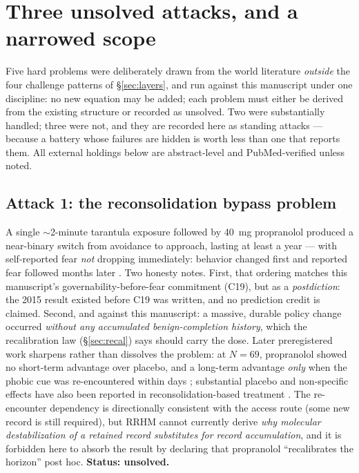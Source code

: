 \documentclass[9pt,twocolumn]{article}
\begin{document}
\section{Three unsolved attacks, and a narrowed scope}
\label{sec:attacks}
Five hard problems were deliberately drawn from the world literature \emph{outside} the four challenge patterns of \S\ref{sec:layers}, and run against this manuscript under one discipline: no new equation may be added; each problem must either be derived from the existing structure or recorded as unsolved. Two were substantially handled; three were not, and they are recorded here as standing attacks --- because a battery whose failures are hidden is worth less than one that reports them. All external holdings below are abstract-level and PubMed-verified unless noted.

\subsection{Attack 1: the reconsolidation bypass problem}
A single $\sim$2-minute tarantula exposure followed by 40~mg propranolol produced a near-binary switch from avoidance to approach, lasting at least a year --- with self-reported fear \emph{not} dropping immediately: behavior changed first and reported fear followed months later \cite{soeter2015}. Two honesty notes. First, that ordering matches this manuscript's governability-before-fear commitment (C19), but as a \emph{postdiction}: the 2015 result existed before C19 was written, and no prediction credit is claimed. Second, and against this manuscript: a massive, durable policy change occurred \emph{without any accumulated benign-completion history}, which the recalibration law (\S\ref{sec:recal}) says should carry the dose. Later preregistered work sharpens rather than dissolves the problem: at $N{=}69$, propranolol showed no short-term advantage over placebo, and a long-term advantage \emph{only} when the phobic cue was re-encountered within days \cite{elsey2025}; substantial placebo and non-specific effects have also been reported in reconsolidation-based treatment \cite{steinfurth2021}. The re-encounter dependency is directionally consistent with the access route (some new record is still required), but RRHM cannot currently derive \emph{why molecular destabilization of a retained record substitutes for record accumulation}, and it is forbidden here to absorb the result by declaring that propranolol ``recalibrates the horizon'' post hoc. \textbf{Status: unsolved.}
\end{document}
